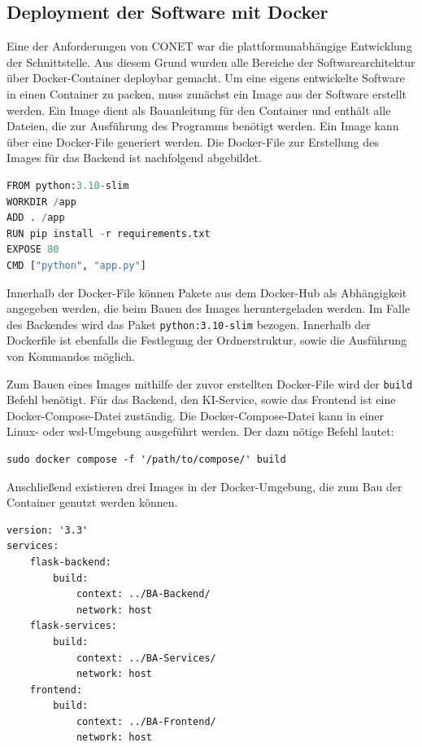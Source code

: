 \subsection{Deployment der Software mit Docker}
Eine der Anforderungen von CONET war die plattformunabhängige Entwicklung der Schnittstelle. Aus diesem Grund wurden alle Bereiche der Softwarearchitektur über Docker-Container deploybar gemacht. Um eine eigens entwickelte Software in einen Container zu packen, muss zunächst ein Image aus der Software erstellt werden. Ein Image dient als Bauanleitung für den Container und enthält alle Dateien, die zur Ausführung des Programms benötigt werden. Ein Image kann über eine Docker-File generiert werden. Die Docker-File zur Erstellung des Images für das Backend ist nachfolgend abgebildet.

\begin{lstlisting}[language=Python, caption={Beispiel einer Dockefile}]
FROM python:3.10-slim
WORKDIR /app
ADD . /app
RUN pip install -r requirements.txt
EXPOSE 80
CMD ["python", "app.py"]
\end{lstlisting}

Innerhalb der Docker-File können Pakete aus dem Docker-Hub als Abhängigkeit angegeben werden, die beim Bauen des Images heruntergeladen werden. Im Falle des Backendes wird das Paket \texttt{python:3.10-slim} bezogen. Innerhalb der Dockerfile ist ebenfalls die Festlegung der Ordnerstruktur, sowie die Ausführung von Kommandos möglich.

Zum Bauen eines Images mithilfe der zuvor erstellten Docker-File wird der \texttt{build} Befehl benötigt. Für das Backend, den KI-Service, sowie das Frontend ist eine Docker-Compose-Datei zuständig. Die Docker-Compose-Datei kann in einer Linux- oder \ac{wsl}-Umgebung ausgeführt werden. Der dazu nötige Befehl lautet:
\begin{lstlisting}[caption={Build Befehl zur Erstellung von Docker-Images aus einer Compose-Datei}]
sudo docker compose -f '/path/to/compose/' build
\end{lstlisting}
Anschließend existieren drei Images in der Docker-Umgebung, die zum Bau der Container genutzt werden können. 

\begin{lstlisting}[caption={Docker-Compose-Datei zum Bauen der Docker-Images}]
version: '3.3'
services: 
    flask-backend:
        build: 
            context: ../BA-Backend/
            network: host
    flask-services:
        build:
            context: ../BA-Services/
            network: host
    frontend:
        build:
            context: ../BA-Frontend/
            network: host
\end{lstlisting}

